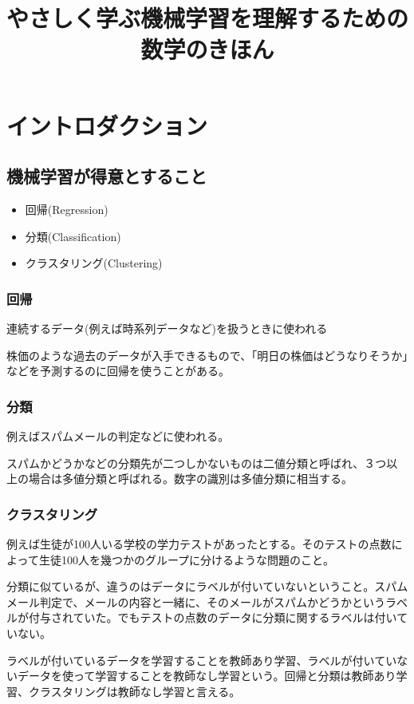 \documentclass{jsarticle}
\title{やさしく学ぶ機械学習を理解するための数学のきほん}
\begin{document}
\maketitle
\section{イントロダクション}

\subsection{機械学習が得意とすること}

\begin{itemize}
	\item{回帰(Regression)}
    \item{分類(Classification)}
    \item{クラスタリング(Clustering)}
\end{itemize}

\subsubsection{回帰}
連続するデータ(例えば時系列データなど)を扱うときに使われる

株価のような過去のデータが入手できるもので、「明日の株価はどうなりそうか」などを予測するのに回帰を使うことがある。

\subsubsection{分類}
例えばスパムメールの判定などに使われる。

スパムかどうかなどの分類先が二つしかないものは二値分類と呼ばれ、３つ以上の場合は多値分類と呼ばれる。数字の識別は多値分類に相当する。

\subsubsection{クラスタリング}
例えば生徒が100人いる学校の学力テストがあったとする。そのテストの点数によって生徒100人を幾つかのグループに分けるような問題のこと。

分類に似ているが、違うのはデータにラベルが付いていないということ。スパムメール判定で、メールの内容と一緒に、そのメールがスパムかどうかというラベルが付与されていた。でもテストの点数のデータに分類に関するラベルは付いていない。

ラベルが付いているデータを学習することを教師あり学習、ラベルが付いていないデータを使って学習することを教師なし学習という。回帰と分類は教師あり学習、クラスタリングは教師なし学習と言える。
\end{document}
